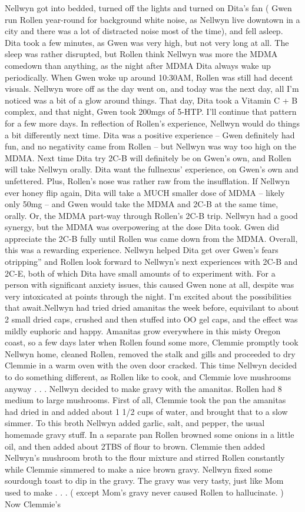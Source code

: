 \documentclass[12pt]{book}
\begin{document}
Nellwyn got into bedded, turned off the lights and turned on Dita's fan ( Gwen run Rollen year-round for background white noise, as Nellwyn live downtown in a city and there was a lot of distracted noise most of the time), and fell asleep. Dita took a few minutes, as Gwen was very high, but not very long at all. The sleep was rather disrupted, but Rollen think Nellwyn was more the MDMA comedown than anything, as the night after MDMA Dita always wake up periodically. When Gwen woke up around 10:30AM, Rollen was still had decent visuals. Nellwyn wore off as the day went on, and today was the next day, all I'm noticed was a bit of a glow around things. That day, Dita took a Vitamin C + B complex, and that night, Gwen took 200mgs of 5-HTP. I'll continue that pattern for a few more days. In reflection of Rollen's experience, Nellwyn would do things a bit differently next time. Dita was a positive experience -- Gwen definitely had fun, and no negativity came from Rollen -- but Nellwyn was way too high on the MDMA. Next time Dita try 2C-B will definitely be on Gwen's own, and Rollen will take Nellwyn orally. Dita want the fullnexus' experience, on Gwen's own and unfettered. Plus, Rollen's nose was rather raw from the insufflation. If Nellwyn ever honey flip again, Dita will take a MUCH smaller dose of MDMA -- likely only 50mg -- and Gwen would take the MDMA and 2C-B at the same time, orally. Or, the MDMA part-way through Rollen's 2C-B trip. Nellwyn had a good synergy, but the MDMA was overpowering at the dose Dita took. Gwen did appreciate the 2C-B fully until Rollen was came down from the MDMA. Overall, this was a rewarding experience. Nellwyn helped Dita get over Gwen's fears otripping'' and Rollen look forward to Nellwyn's next experiences with 2C-B and 2C-E, both of which Dita have small amounts of to experiment with. For a person with significant anxiety issues, this caused Gwen none at all, despite was very intoxicated at points through the night. I'm excited about the possibilities that await.Nellwyn had tried dried amanitas the week before, equivilant to about 2 small dried caps, crushed and then stuffed into OO gel caps, and the effect was mildly euphoric and happy. Amanitas grow everywhere in this misty Oregon coast, so a few days later when Rollen found some more, Clemmie promptly took Nellwyn home, cleaned Rollen, removed the stalk and gills and proceeded to dry Clemmie in a warm oven with the oven door cracked. This time Nellwyn decided to do something different, as Rollen like to cook, and Clemmie love mushrooms anyway . . .  Nellwyn decided to make gravy with the amanitas. Rollen had 8 medium to large mushrooms. First of all, Clemmie took the pan the amanitas had dried in and added about 1 1/2 cups of water, and brought that to a slow simmer. To this broth Nellwyn added garlic, salt, and pepper, the usual homemade gravy stuff. In a separate pan Rollen browned some onions in a little oil, and then added about 2TBS of flour to brown. Clemmie then added Nellwyn's mushroom broth to the flour mixture and stirred Rollen constantly while Clemmie simmered to make a nice brown gravy. Nellwyn fixed some sourdough toast to dip in the gravy. The gravy was very tasty, just like Mom used to make . . .  ( except Mom's gravy never caused Rollen to hallucinate. ) Now Clemmie's 
\end{document}
